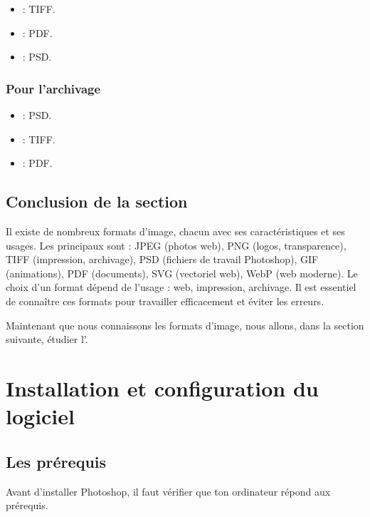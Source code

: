 \begin{itemize}
    \item {} : TIFF.
    \item {} : PDF.
    \item {} : PSD.
\end{itemize}

\subsubsection{Pour l'archivage}

\begin{itemize}
    \item {} : PSD.
    \item {} : TIFF.
    \item {} : PDF.
\end{itemize}

\subsection*{Conclusion de la section}

Il existe de nombreux formats d'image, chacun avec ses caractéristiques et ses usages. Les principaux sont : JPEG (photos web), PNG (logos, transparence), TIFF (impression, archivage), PSD (fichiers de travail Photoshop), GIF (animations), PDF (documents), SVG (vectoriel web), WebP (web moderne). Le choix d'un format dépend de l'usage : web, impression, archivage. Il est essentiel de connaître ces formats pour travailler efficacement et éviter les erreurs.

Maintenant que nous connaissons les formats d'image, nous allons, dans la section suivante, étudier l'.

\section{Installation et configuration du logiciel}

\subsection{Les prérequis}

Avant d'installer Photoshop, il faut vérifier que ton ordinateur répond aux prérequis.

